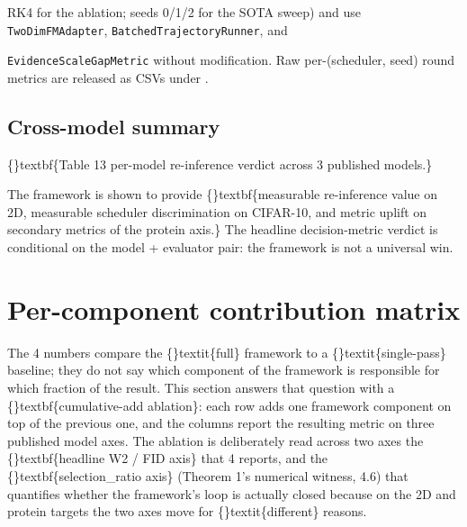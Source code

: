 \documentclass{article}
\begin{document}
 RK4 for the ablation; seeds 0/1/2 for the SOTA sweep) and use \texttt{TwoDimFMAdapter}, \texttt{BatchedTrajectoryRunner}, and

\texttt{EvidenceScaleGapMetric} without modification. Raw per-(scheduler, seed) round metrics are released as CSVs under .

\subsection{Cross-model summary}
\{\}textbf\{Table 13  per-model re-inference verdict across 3 published models.\}

\begin{table}[ht]
\centering
\small
{}%
\end{table}

The framework is shown to provide \{\}textbf\{measurable re-inference value on 2D, measurable scheduler discrimination on CIFAR-10, and metric uplift on secondary metrics of the protein axis.\} The headline decision-metric verdict is conditional on the model + evaluator pair: the framework is not a universal win.

\section{Per-component contribution matrix}
The 4 numbers compare the \{\}textit\{full\} framework to a \{\}textit\{single-pass\} baseline; they do not say which component of the framework is responsible for which fraction of the result. This section answers that question with a \{\}textbf\{cumulative-add ablation\}: each row adds one framework component on top of the previous one, and the columns report the resulting metric on three published model axes. The ablation is deliberately read across two axes  the \{\}textbf\{headline W2 / FID axis\} that 4 reports, and the \{\}textbf\{selection\_ratio axis\} (Theorem 1's numerical witness, 4.6) that quantifies whether the framework's loop is actually closed  because on the 2D and protein targets the two axes move for \{\}textit\{different\} reasons.
\end{document}
